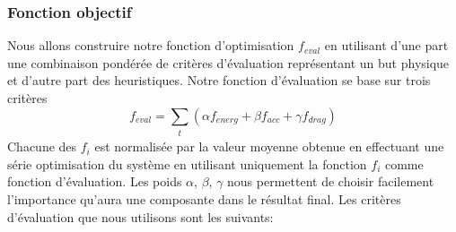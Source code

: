 \documentclass[runningheads,a4paper]{llncs}
\begin{document}
\subsubsection{Fonction objectif}
%
Nous allons construire notre fonction d'optimisation $f_{eval}$ en utilisant d'une part une combinaison pondérée de critères d'évaluation représentant un but physique et d'autre part des heuristiques. Notre fonction d'évaluation se base sur trois critères 
\begin{equation}
f_{eval}=\sum_{\substack{t}} (\alpha f_{energ} + \beta f_{acc} + \gamma f_{drag})
\label{eq:simple_objective}
\end{equation}
Chacune des $f_i$ est normalisée par la valeur moyenne obtenue en effectuant une série optimisation du système en utilisant uniquement la fonction $f_i$ comme fonction d'évaluation. Les poids $\alpha$, $\beta$, $\gamma$ nous permettent de choisir facilement l'importance qu'aura une composante dans le résultat final. Les critères d'évaluation que nous utilisons sont les suivants:
\end{document}
